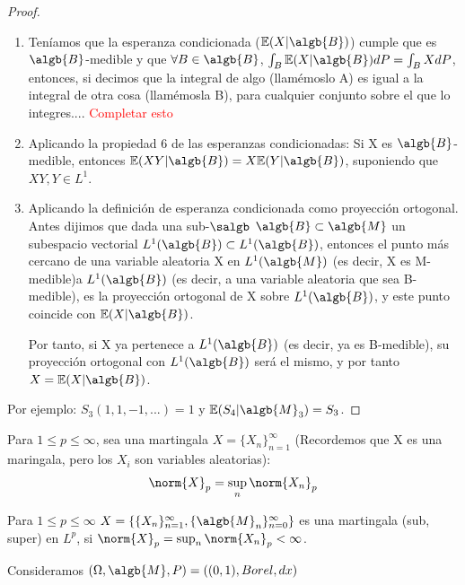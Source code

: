 \documentclass{apuntes}
\begin{document}
\begin{example}
\begin{enumerate}
\begin{proof}
\begin{enumerate}
\item Teníamos que la esperanza condicionada ($\mathbb{E}(X|\algb{B})$) cumple que es $\algb{B}$-medible y que
$\forall B \in \algb{B}$, $\int_{B}\mathbb{E}(X|\algb{B})dP=\int_{B}XdP$, entonces, si decimos que la integral de algo (llamémoslo A) es igual a la integral de otra cosa (llamémosla B), para cualquier conjunto sobre el que lo integres.... \textcolor{red}{Completar esto}
\item Aplicando la propiedad 6 de las esperanzas condicionadas:
Si X es $\algb{B}$-medible, entonces $\mathbb{E}(XY|\algb{B}) = X\mathbb{E}(Y|\algb{B})$, suponiendo que $XY,Y \in L^1$.
\item Aplicando la definición de esperanza condicionada como proyección ortogonal. Antes dijimos que dada una sub-$\salgb$ $\algb{B} \subset \algb{M}$ un subespacio vectorial $L^1(\algb{B}) \subset L^1(\algb{B})$, entonces el punto más cercano de una variable aleatoria X en $L^1(\algb{M})$ (es decir, X es M-medible)a $L^1(\algb{B})$ (es decir, a una variable aleatoria que sea B-medible), es la proyección ortogonal de X sobre $L^1(\algb{B})$, y este punto coincide con $\mathbb{E}(X|\algb{B})$.

Por tanto, si X ya pertenece a $L^1(\algb{B})$ (es decir, ya es B-medible), su proyección ortogonal con $L^1(\algb{B})$ será el mismo, y por tanto $X=\mathbb{E}(X|\algb{B})$.
\end{enumerate}



Por ejemplo: $S_3(1,1,-1,...)=1$ y $\mathbb{E}(S_4|\algb{M}_3)=S_3$.
\end{proof}

\begin{defn}
Para $1 \leq p \leq \infty$, sea una martingala $X=\{X_n\}_{n=1}^{\infty}$ (Recordemos que X es una maringala, pero los $X_i$ son variables aleatorias):
\[
\norm{X}_p = \sup_n \norm{X_n}_p
\]
\end{defn}

\begin{theorem}
Para $1 \leq p \leq \infty$ $X=\{\{X_n\}_{n=1}^{\infty}, \{\algb{M}_n\}_{n=0}^{\infty}\}$ es una martingala (sub, super) en $L^p$, si $\norm{X}_p = \sup_n \norm{X_n}_p < \infty$. 
\end{theorem}

\begin{example}
Consideramos $(\Omega, \algb{M}, P) = ((0,1), Borel, dx)$


\end{example}
\end{enumerate}
\end{example}
\end{document}
